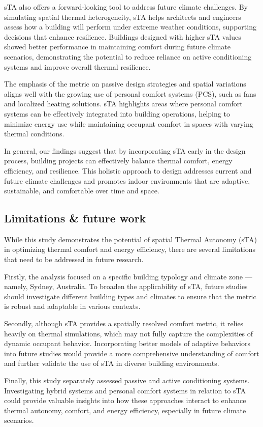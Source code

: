 sTA also offers a forward-looking tool to address future climate challenges. By simulating spatial thermal heterogeneity, sTA helps architects and engineers assess how a building will perform under extreme weather conditions, supporting decisions that enhance resilience. Buildings designed with higher sTA values showed better performance in maintaining comfort during future climate scenarios, demonstrating the potential to reduce reliance on active conditioning systems and improve overall thermal resilience.

The emphasis of the metric on passive design strategies and spatial variations aligns well with the growing use of personal comfort systems (PCS), such as fans and localized heating solutions. sTA highlights areas where personal comfort systems can be effectively integrated into building operations, helping to minimize energy use while maintaining occupant comfort in spaces with varying thermal conditions.

In general, our findings suggest that by incorporating sTA early in the design process, building projects can effectively balance thermal comfort, energy efficiency, and resilience. This holistic approach to design addresses current and future climate challenges and promotes indoor environments that are adaptive, sustainable, and comfortable over time and space.





\subsection{Limitations \& future work}

While this study demonstrates the potential of spatial Thermal Autonomy (sTA) in optimizing thermal comfort and energy efficiency, there are several limitations that need to be addressed in future research.

Firstly, the analysis focused on a specific building typology and climate zone — namely, Sydney, Australia. To broaden the applicability of sTA, future studies should investigate different building types and climates to ensure that the metric is robust and adaptable in various contexts.

Secondly, although sTA provides a spatially resolved comfort metric, it relies heavily on thermal simulations, which may not fully capture the complexities of dynamic occupant behavior. Incorporating better models of adaptive behaviors into future studies would provide a more comprehensive understanding of comfort and further validate the use of sTA in diverse building environments.

Finally, this study separately assessed passive and active conditioning systems. Investigating hybrid systems and personal comfort systems in relation to sTA could provide valuable insights into how these approaches interact to enhance thermal autonomy, comfort, and energy efficiency, especially in future climate scenarios.